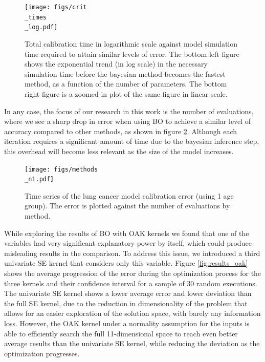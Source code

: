 \documentclass{IOS-Book-Article}
\begin{document}
	\begin{figure}[h!]
		\centering	
		\texttt{[image: figs/crit\\\_times\\\_log.pdf]}		
		\caption{Total calibration time in logarithmic scale against model simulation time required to attain similar levels of error. The bottom left figure shows the exponential trend (in log scale) in the necessary simulation time before the bayesian method becomes the fastest method, as a function of the number of parameters. The bottom right figure is a zoomed-in plot of the same figure in linear scale.}
		\label{fig:sim_times}	
	\end{figure}
	
	In any case, the focus of our research in this work is the number of evaluations, where we see a sharp drop in error when using BO to achieve a similar level of accuracy compared to other methods, as shown in figure \ref{fig:method_comparison}. Although each iteration requires a significant amount of time due to the bayesian inference step, this overhead will become less relevant as the size of the model increases.
	
	\begin{figure}[h!]
		\centering	
		\texttt{[image: figs/methods\\\_n1.pdf]}		
		\caption{Time series of the lung cancer model calibration error (using 1 age group). The error is plotted against the number of evaluations by method.}
		\label{fig:method_comparison}	
	\end{figure}
	
	While exploring the results of BO with OAK kernels we found that one of the variables had very significant explanatory power by itself, which could produce misleading results in the comparison. To address this issue, we introduced a third univariate SE kernel that considers only this variable. Figure \ref{fig:results_oak} shows the average progression of the error during the optimization process for the three kernels and their confidence interval for a sample of 30 random executions. The univariate SE kernel shows a lower average error and lower deviation than the full SE kernel, due to the reduction in dimensionality of the problem that allows for an easier exploration of the solution space, with barely any information loss. However, the OAK kernel under a normality assumption for the inputs is able to efficiently search the full 11-dimensional space to reach even better average results than the univariate SE kernel, while reducing the deviation as the optimization progresses.
	
\end{document}
